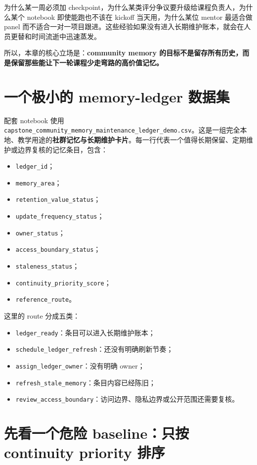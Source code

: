 为什么某一周必须加 checkpoint，为什么某类评分争议要升级给课程负责人，为什么某个 notebook 即使能跑也不该在 kickoff 当天用，为什么某位 mentor 最适合做 panel 而不适合一对一项目跟进。这些经验如果没有进入长期维护账本，就会在人员更替和时间流逝中迅速蒸发。

所以，本章的核心立场是：\textbf{community memory 的目标不是留存所有历史，而是保留那些能让下一轮课程少走弯路的高价值记忆。}

\section{一个极小的 memory-ledger 数据集}

配套 notebook 使用 \nolinkurl{capstone_community_memory_maintenance_ledger_demo.csv}。这是一组完全本地、教学用途的\textbf{社群记忆与长期维护卡片}。每一行代表一个值得长期保留、定期维护或边界复核的记忆条目，包含：

\begin{itemize}
    \item \texttt{ledger\_id}；
    \item \texttt{memory\_area}；
    \item \texttt{retention\_value\_status}；
    \item \texttt{update\_frequency\_status}；
    \item \texttt{owner\_status}；
    \item \texttt{access\_boundary\_status}；
    \item \texttt{staleness\_status}；
    \item \texttt{continuity\_priority\_score}；
    \item \texttt{reference\_route}。
\end{itemize}

这里的 route 分成五类：

\begin{itemize}
    \item \texttt{ledger\_ready}：条目可以进入长期维护账本；
    \item \texttt{schedule\_ledger\_refresh}：还没有明确刷新节奏；
    \item \texttt{assign\_ledger\_owner}：没有明确 owner；
    \item \texttt{refresh\_stale\_memory}：条目内容已经陈旧；
    \item \texttt{review\_access\_boundary}：访问边界、隐私边界或公开范围还需要复核。
\end{itemize}

\section{先看一个危险 baseline：只按 continuity priority 排序}


